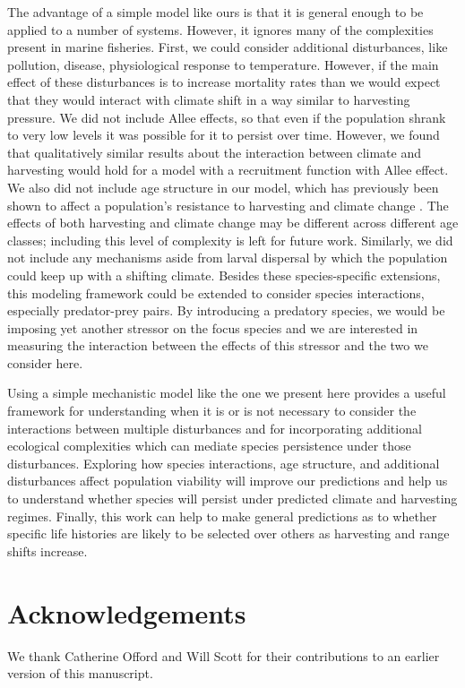 \documentclass[12pt,english]{article}
\begin{document}
\begin{spacing}{1.9}
\begin{flushleft}
The advantage of a simple model like ours is that it is general enough to be applied to a number of systems.  However, it  ignores many of the complexities present in marine fisheries.  First, we could consider additional disturbances, like pollution, disease, physiological response to temperature.  However, if the main effect of these disturbances is to increase mortality rates than we would expect that they would interact with climate shift in a way similar to harvesting pressure.  We did not include Allee effects, so that even if the population shrank to very low levels it was possible for it to persist over time. However, we found that qualitatively similar results about the interaction between climate and harvesting would hold for a model with a recruitment function with Allee effect. We also did not include age structure in our model, which has previously been shown to affect a population's resistance to harvesting and climate change \citep{Botsfordetal2001}. The effects of both harvesting and climate change may be different across different age classes; including this level of complexity is left for future work. Similarly, we did not include any mechanisms aside from larval dispersal by which the population could keep up with a shifting climate.  Besides these species-specific extensions, this modeling framework could be extended to consider species interactions, especially predator-prey pairs.  By introducing a predatory species, we would be imposing yet another stressor on the focus species \citep{Lingetal2009, Gurevitchetal2000} and we are interested in measuring the interaction between the effects of this stressor and the two we consider here.

Using a simple mechanistic model like the one we present here provides a useful framework for understanding when it is or is not necessary to consider the interactions between multiple disturbances and for incorporating additional ecological complexities which can mediate species persistence under those disturbances. Exploring how species interactions, age structure, and additional disturbances affect population viability will improve our predictions and help us to understand whether species will persist under predicted climate and harvesting regimes. Finally, this work can help to make general predictions as to whether specific life histories are likely to be selected over others as harvesting and range shifts increase.


\section*{ Acknowledgements}
We thank Catherine Offord and Will Scott for their contributions to an earlier version of this manuscript. 

\end{flushleft}
\end{spacing}
\end{document}
